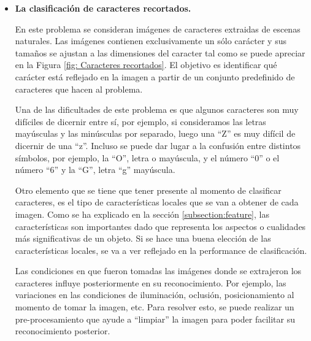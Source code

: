 	\begin{itemize}
		\item \textbf{La clasificación de caracteres recortados.}
		
		En este problema se consideran imágenes de caracteres extraidas de escenas naturales. Las imágenes contienen exclusivamente un sólo carácter y sus tamaños se ajustan a las dimensiones del caracter tal como se puede apreciar en la Figura \ref{fig: Caracteres recortados}. El objetivo es identificar qué carácter está reflejado en la imagen a partir de un conjunto predefinido de caracteres que hacen al problema.

		Una de las dificultades de este problema es que algunos caracteres son muy difíciles de dicernir entre sí, por ejemplo, si consideramos las letras mayúsculas y las minúsculas por separado, luego una ``Z'' es muy difícil de dicernir de una ``z''. Incluso se puede dar lugar a la confusión entre distintos símbolos, por ejemplo, la ``O'', letra o mayúscula, y el número ``0'' o el número ``6'' y la ``G'', letra ``g'' mayúscula.
						
		Otro elemento que se tiene que tener presente al momento de clasificar caracteres, es el tipo de características locales que se van a obtener de cada imagen. Como se ha explicado en la sección \ref{subsection:feature}, las características son importantes dado que representa los aspectos o cualidades más significativas de un objeto. Si se hace una buena elección de las características locales, se va a ver reflejado en la performance de clasificación.
		
		Las condiciones en que fueron tomadas las imágenes donde se extrajeron los caracteres influye posteriormente en su reconocimiento. Por ejemplo, las variaciones en las condiciones de iluminación, oclusión, posicionamiento al momento de tomar la imagen, etc. Para resolver esto, se puede realizar un pre-procesamiento que ayude a ``limpiar'' la imagen para poder facilitar su reconocimiento posterior.
		

\end{itemize}
